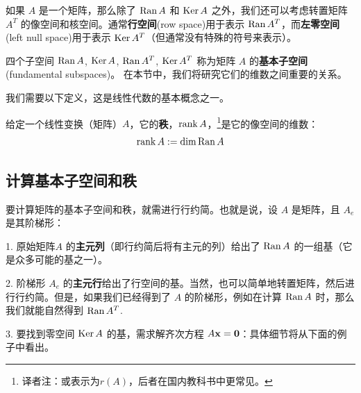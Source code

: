 如果 $A$ 是一个矩阵，那么除了 $\operatorname{Ran} A$ 和 $\operatorname{Ker} A$ 之外，我们还可以考虑转置矩阵 $A^T$ 的像空间和核空间。通常\textbf{行空间}(row space)用于表示 $\operatorname{Ran} A^T$，而\textbf{左零空间}(left null space)用于表示 $\operatorname{Ker} A^T$（但通常没有特殊的符号来表示）。

四个子空间 $\operatorname{Ran} A$, $\operatorname{Ker} A$, $\operatorname{Ran} A^T$, $\operatorname{Ker} A^T$ 称为矩阵 $A$ 的\textbf{基本子空间}(fundamental subspaces)。
在本节中，我们将研究它们的维数之间重要的关系。


我们需要以下定义，这是线性代数的基本概念之一。

\begin{definition*}
给定一个线性变换（矩阵）$A$，它的\textbf{秩}，$\operatorname{rank} A$，\footnote{译者注：或表示为$r(A)$，后者在国内教科书中更常见。}是它的像空间的维数：
$$
\operatorname{rank} A := \dim \operatorname{Ran} A
$$
\end{definition*}


\subsection{计算基本子空间和秩}\label{sec:02-07-01}

要计算矩阵的基本子空间和秩，就需进行行约简。也就是说，设 $A$ 是矩阵，且 $A_e$ 是其阶梯形：

1. 原始矩阵$A$ 的\textbf{主元列}（即行约简后将有主元的列）给出了 $\operatorname{Ran} A$ 的一组基（它是众多可能的基之一）。

2. 阶梯形 $A_e$ 的\textbf{主元行}给出了行空间的基。当然，也可以简单地转置矩阵，然后进行行约简。但是，如果我们已经得到了 $A$ 的阶梯形，例如在计算 $\operatorname{Ran} A$ 时，那么我们就能自然得到 $\operatorname{Ran} A^T$. ~

3. 要找到零空间 $\operatorname{Ker} A$ 的基，需求解齐次方程 $A \mathbf{x} = \mathbf{0}$：具体细节将从下面的例子中看出。

